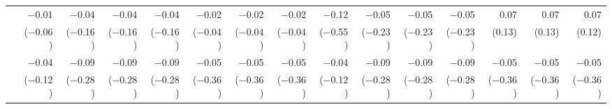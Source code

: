 \begin{tabularx}{1.45\textwidth}{lRRRRRRRRRRRRRR}
		 & \num{-0.01}\phantom{***)} & \num{-0.04}\phantom{***)} & \num{-0.04}\phantom{***)} & \num{-0.04}\phantom{***)} & \num{-0.02}\phantom{***)} & \num{-0.02}\phantom{***)} & \num{-0.02}\phantom{***)} & \num{-0.12}\phantom{***)} & \num{-0.05}\phantom{***)} & \num{-0.05}\phantom{***)} & \num{-0.05}\phantom{***)} & \num{0.07}\phantom{***)} & \num{0.07}\phantom{***)} & \num{0.07}\phantom{***)} \\
		 & (\num{-0.06})\phantom{***} & (\num{-0.16})\phantom{***} & (\num{-0.16})\phantom{***} & (\num{-0.16})\phantom{***} & (\num{-0.04})\phantom{***} & (\num{-0.04})\phantom{***} & (\num{-0.04})\phantom{***} & (\num{-0.55})\phantom{***} & (\num{-0.23})\phantom{***} & (\num{-0.23})\phantom{***} & (\num{-0.23})\phantom{***} & (\num{0.13})\phantom{***} & (\num{0.13})\phantom{***} & (\num{0.12})\phantom{***} \\ [\dspacing]
		 & \num{-0.04}\phantom{***)} & \num{-0.09}\phantom{***)} & \num{-0.09}\phantom{***)} & \num{-0.09}\phantom{***)} & \num{-0.05}\phantom{***)} & \num{-0.05}\phantom{***)} & \num{-0.05}\phantom{***)} & \num{-0.04}\phantom{***)} & \num{-0.09}\phantom{***)} & \num{-0.09}\phantom{***)} & \num{-0.09}\phantom{***)} & \num{-0.05}\phantom{***)} & \num{-0.05}\phantom{***)} & \num{-0.05}\phantom{***)} \\
		 & (\num{-0.12})\phantom{***} & (\num{-0.28})\phantom{***} & (\num{-0.28})\phantom{***} & (\num{-0.28})\phantom{***} & (\num{-0.36})\phantom{***} & (\num{-0.36})\phantom{***} & (\num{-0.36})\phantom{***} & (\num{-0.12})\phantom{***} & (\num{-0.28})\phantom{***} & (\num{-0.28})\phantom{***} & (\num{-0.28})\phantom{***} & (\num{-0.36})\phantom{***} & (\num{-0.36})\phantom{***} & (\num{-0.36})\phantom{***} \\ [\dspacing]
        \bottomrule
    \end{tabularx}%
